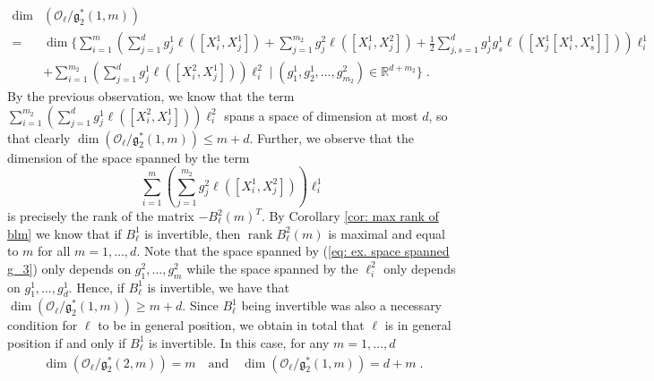 \documentclass[10pt,a4paper]{amsart}
\newcommand{\R}{\mathbb{R}}
\newcommand{\fancyg}{\mathfrak{g}}
\newcommand{\rank}{\operatorname{rank}}
\begin{document}
\begin{example}
		\begin{align*}
			\dim&\left(\mathcal{O}_{\ell}/\fancyg_{2}^*(1, m)\right) \\
            =& \dim \Bigg\{\sum_{i=1}^m \left(\sum_{j=1}^{d} g_j^1\ell([X_i^1,X_j^1]) + \sum_{j=1}^{m_2} g_j^2\ell([X_i^1,X_j^2]) + \frac{1}{2} \sum_{j,s = 1}^d g_j^1g_s^1\ell([X_j^1[X_i^1,X_s^1]]) \right)\ell_i^1\\
			&+ \sum_{i=1}^{m_2}\left(\sum_{j=1}^{d} g_j^1\ell([X_i^2,X_j^1])\right)\ell_i^2 \;\Big| \; (g_1^1, g_2^1, \ldots, g_{m_2}^2) \in \R^{d+m_2}\Bigg\} \;.
		\end{align*}
		By the previous observation, we know that the term
		$\sum_{i=1}^{m_2}\left(\sum_{j=1}^{d} g_j^1\ell([X_i^2,X_j^1])\right)\ell_i^2$
		spans a space of dimension at most $d$, so that clearly $\dim\left(\mathcal{O}_{\ell}/\fancyg_{2}^*(1, m)\right) \leq m +d$. Further, we observe that the dimension of the space spanned by the term
		\begin{equation}\label{eq: ex. space spanned g_3}
			\sum_{i=1}^m \left(\sum_{j=1}^{m_2} g_j^2\ell([X_i^1,X_j^2])\right)\ell_i^1
		\end{equation}
		is precisely the rank of the matrix $-B_{\ell}^2(m)^T$. By Corollary \ref{cor: max rank of blm} we know that if $B_{\ell}^1$ is invertible, then $\rank B_{\ell}^2(m)$ is maximal and equal to $m$ for all $m =1, \ldots, d$. 
		Note that the space spanned by (\ref{eq: ex. space spanned g_3}) only depends on $g_1^2, \ldots, g_m^2$ while the space spanned by the $\ell_i^2$ only depends on $g_1^1,\ldots,g_d^1$. Hence, if $B_{\ell}^1$ is invertible, we have that  $\dim\left(\mathcal{O}_{\ell}/\fancyg_{2}^*(1, m)\right) \geq m +d$. Since $B_{\ell}^1$ being invertible was also a necessary condition for $\ell$ to be in general position, we obtain in total that $\ell$ is in general position if and only if $B_{\ell}^1$ is invertible. In this case, for any $m = 1, \ldots, d$
		\begin{align*}
			\dim\left(\mathcal{O}_{\ell}/\fancyg_{2}^*(2, m)\right) = m \quad \text{and} \quad
			\dim\left(\mathcal{O}_{\ell}/\fancyg_{2}^*(1, m)\right) = d + m \;.
		\end{align*}
	\end{example}
\end{document}
